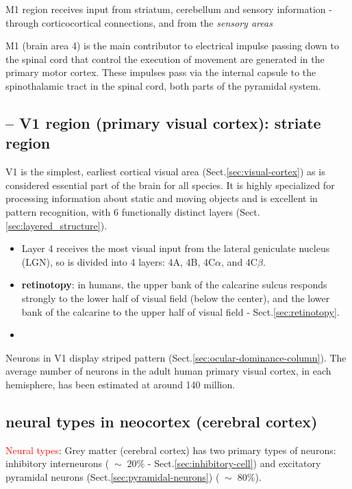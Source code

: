 M1 region receives input from striatum, cerebellum and sensory information -
through corticocortical connections, and from the {\it sensory areas} 
  
M1 (brain area 4) is the main contributor to electrical impulse passing down to
the spinal cord that control the execution of movement are generated in the
primary motor cortex. These impulses pass via the internal capsule to the
spinothalamic tract in the spinal cord, both parts of the pyramidal system.


\subsection{-- V1 region (primary visual cortex): striate region}
\label{sec:V1-region}

V1 is the simplest, earliest cortical visual area (Sect.\ref{sec:visual-cortex})
as is considered essential part of the brain for all species. It is highly
specialized for processing information about static and moving objects and is
excellent in pattern recognition, with 6 functionally distinct layers
(Sect.\ref{sec:layered_structure}).
\begin{itemize}
  \item Layer 4 receives the most visual input from the lateral geniculate
  nucleus (LGN), so is divided into 4 layers:  4A, 4B, 4C$\alpha$, and
  4C$\beta$.
  
  \item {\bf retinotopy}: in humans, the upper bank of the calcarine sulcus
  responds strongly to the lower half of visual field (below the center), and
  the lower bank of the calcarine to the upper half of visual field -
  Sect.\ref{sec:retinotopy}.

  
  \item 
\end{itemize}

Neurons in V1 display striped pattern
(Sect.\ref{sec:ocular-dominance-column}). The average number of neurons in the
adult human primary visual cortex, in each hemisphere, has been estimated at
around 140 million.


\subsection{neural types in neocortex (cerebral cortex)}

\textcolor{red}{Neural types}: Grey matter (cerebral cortex) has two primary
types of neurons: inhibitory interneurons ($\; \sim\;
20\%$ - Sect.\ref{sec:inhibitory-cell}) and excitatory pyramidal neurons
(Sect.\ref{sec:pyramidal-neurons}) ($\;\sim\; 80\%$). 

